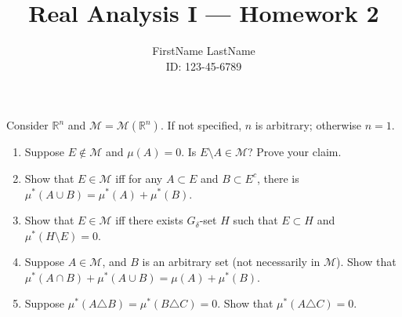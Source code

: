 \documentclass{article}
\title{Real Analysis I --- Homework 2}
\author{FirstName LastName \\ ID: 123-45-6789}
\date{}
\begin{document}
\maketitle

Consider $\mathbb{R}^{n}$ and $\mathcal{M} = \mathcal{M}(\mathbb{R}^{n})$. If not specified, $n$ is arbitrary; otherwise $n=1$.
\begin{enumerate}

\item Suppose $E \notin \mathcal{M}$ and $\mu(A) = 0$. Is $E \setminus A \in \mathcal{M}$? Prove your claim.




\item Show that $E \in \mathcal{M}$ iff for any $A \subset E$ and $B \subset E^{c}$, there is $\mu^{*} (A \cup B) = \mu^{*} (A) + \mu^{*} (B)$.




\item Show that $E \in \mathcal{M}$ iff there exists $G_{\delta}$-set $H$ such that $E \subset H$ and $\mu^{*} (H \setminus E) = 0$.




\item Suppose $A \in \mathcal{M}$, and $B$ is an arbitrary set (not necessarily in $\mathcal{M}$). Show that $\mu^{*} (A \cap B) + \mu^{*} (A \cup B) = \mu(A) + \mu^{*} (B)$.




\item Suppose $\mu^{*} (A \triangle B) = \mu^{*} (B \triangle C) = 0$. Show that $\mu^{*} (A \triangle C) = 0$.


\end{enumerate}
\end{document}
